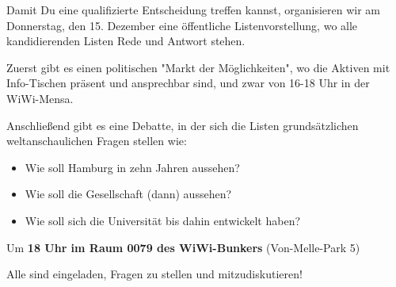 \documentclass[a4paper,ngerman,headheight=80pt,12pt,DIV=calc]{scrartcl}
\begin{document}
    Damit Du eine qualifizierte Entscheidung treffen kannst, organisieren wir
    am Donnerstag, den 15. Dezember eine öffentliche Listenvorstellung, wo alle
    kandidierenden Listen Rede und Antwort stehen.

    Zuerst gibt es einen politischen "Markt der Möglichkeiten", wo die Aktiven
    mit Info-Tischen präsent und ansprechbar sind, und zwar von 16-18 Uhr in der
    WiWi-Mensa.

    Anschließend gibt es eine Debatte, in der sich die Listen grundsätzlichen
    weltanschaulichen Fragen stellen wie:

    \begin{itemize}
        \item Wie soll Hamburg in zehn Jahren aussehen?
        \item Wie soll die Gesellschaft (dann) aussehen?
        \item Wie soll sich die Universität bis dahin entwickelt haben?
    \end{itemize}

    Um \textbf{18 Uhr im Raum 0079 des WiWi-Bunkers} (Von-Melle-Park 5)

    Alle sind eingeladen, Fragen zu stellen und mitzudiskutieren!
\end{document}
